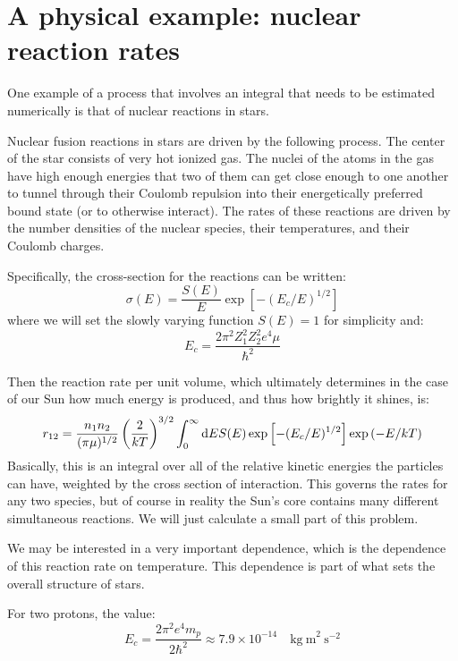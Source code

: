 \section{A physical example: nuclear reaction rates}

One example of a process that involves an integral that needs to be
estimated numerically is that of nuclear reactions in stars. 

Nuclear fusion reactions in stars are driven by the following
process. The center of the star consists of very hot ionized gas. The
nuclei of the atoms in the gas have high enough energies that two of
them can get close enough to one another to tunnel through their
Coulomb repulsion into their energetically preferred bound state (or
to otherwise interact). The rates of these reactions are driven by the
number densities of the nuclear species, their temperatures, and their
Coulomb charges. 

Specifically, the cross-section for the reactions can be written:
\begin{equation}
\sigma(E) = \frac{S(E)}{E} \exp\left[-(E_c / E)^{1/2}\right]
\end{equation}
where we will set the slowly varying function $S(E)=1$ for simplicity
and:
\begin{equation}
E_c = \frac{2\pi^2 Z_1^2 Z_2^2 e^4 \mu}{\hbar^2}
\end{equation}

Then the reaction rate per unit volume, which ultimately determines in
the case of our Sun how much energy is produced, and thus how brightly
it shines, is:
\begin{equation}
r_{12} = \frac{n_1 n_2}{(\pi \mu)^{1/2}}
\left(\frac{2}{kT}\right)^{3/2}  \int_0^\infty {\rm d}E S(E)
\exp\left[-(E_c/E)^{1/2}\right] \exp\left(-E/kT\right)
\end{equation}
Basically, this is an integral over all of the relative kinetic
energies the particles can have, weighted by the cross section of
interaction.
This governs the rates for any two species, but of course in reality
the Sun's core contains many different simultaneous reactions. We will
just calculate a small part of this problem.

We may be interested in a very important dependence, which is the
dependence of this reaction rate on temperature. This dependence is
part of what sets the overall structure of stars. 

For two protons, the value:
\begin{equation}
E_c = \frac{2 \pi^2 e^4 m_p}{2 \hbar^2} \approx 7.9 \times 10^{-14}
\mathrm{\quad kg~m}^2\mathrm{~s}^{-2}
\end{equation}

